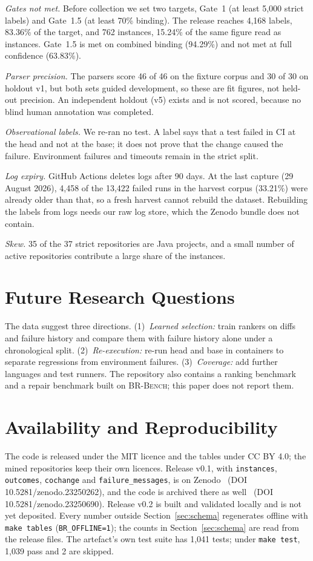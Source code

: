 \documentclass[10pt,conference]{IEEEtran}
\begin{document}
\textit{Gates not met.} Before collection we set two targets, Gate~1 (at least 5,000 strict labels) and Gate~1.5 (at least 70\% binding). The release reaches 4,168 labels, 83.36\% of the target, and 762 instances, 15.24\% of the same figure read as instances. Gate~1.5 is met on combined binding (94.29\%) and not met at full confidence (63.83\%).

\textit{Parser precision.} The parsers score 46 of 46 on the fixture corpus and 30 of 30 on holdout v1, but both sets guided development, so these are fit figures, not held-out precision. An independent holdout (v5) exists and is not scored, because no blind human annotation was completed.

\textit{Observational labels.} We re-ran no test. A label says that a test failed in CI at the head and not at the base; it does not prove that the change caused the failure. Environment failures and timeouts remain in the strict split.

\textit{Log expiry.} GitHub Actions deletes logs after 90 days. At the last capture (29 August 2026), 4,458 of the 13,422 failed runs in the harvest corpus (33.21\%) were already older than that, so a fresh harvest cannot rebuild the dataset. Rebuilding the labels from logs needs our raw log store, which the Zenodo bundle does not contain.

\textit{Skew.} 35 of the 37 strict repositories are Java projects, and a small number of active repositories contribute a large share of the instances.

\section{Future Research Questions}

The data suggest three directions. (1)~\textit{Learned selection:} train rankers on diffs and failure history and compare them with failure history alone under a chronological split. (2)~\textit{Re-execution:} re-run head and base in containers to separate regressions from environment failures. (3)~\textit{Coverage:} add further languages and test runners. The repository also contains a ranking benchmark and a repair benchmark built on \textsc{BR-Bench}; this paper does not report them.

\section{Availability and Reproducibility}

The code is released under the MIT licence and the tables under CC BY 4.0; the mined repositories keep their own licences. Release v0.1, with \texttt{instances}, \texttt{outcomes}, \texttt{cochange} and \texttt{failure\_messages}, is on Zenodo~\cite{brbench_data} (DOI 10.5281/zenodo.23250262), and the code is archived there as well~\cite{brbench_code} (DOI 10.5281/zenodo.23250690). Release v0.2 is built and validated locally and is not yet deposited. Every number outside Section~\ref{sec:schema} regenerates offline with \texttt{make tables} (\texttt{BR\_OFFLINE=1}); the counts in Section~\ref{sec:schema} are read from the release files. The artefact's own test suite has 1,041 tests; under \texttt{make test}, 1,039 pass and 2 are skipped.
\end{document}
